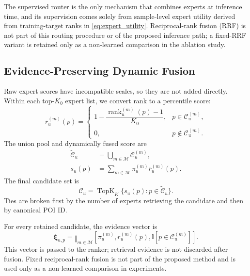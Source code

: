 \documentclass[journal]{IEEEtran}
\newcommand{\Experts}{\mathcal{M}}
\newcommand{\Ind}{\mathbb{I}}
\begin{document}
The supervised router is the only mechanism that combines experts at inference
time, and its supervision comes solely from sample-level expert utility derived
from training-target ranks in \eqref{eq:expert_utility}. Reciprocal-rank fusion
(RRF) is not part of this routing procedure or of the proposed inference path;
a fixed-RRF variant is retained only as a non-learned comparison in the
ablation study.

\subsection{Evidence-Preserving Dynamic Fusion}
\label{subsec:fusion}

Raw expert scores have incompatible scales, so they are not added directly.
Within each top-$K_0$ expert list, we convert rank to a percentile score:
\begin{equation}
\overline r_{u}^{(m)}(p)
=
\begin{cases}
1-\dfrac{\operatorname{rank}_{u}^{(m)}(p)-1}{K_0},
&
p\in\mathcal{C}_{u}^{(m)},\\[7pt]
0,
&
p\notin\mathcal{C}_{u}^{(m)}.
\end{cases}
\label{eq:rank_percentile}
\end{equation}
The union pool and dynamically fused score are
\begin{align}
\widetilde{\mathcal{C}}_u
&=
\bigcup_{m\in\Experts}\mathcal{C}_{u}^{(m)},
\label{eq:union_pool}\\
s_u(p)
&=
\sum_{m\in\Experts}
\pi_u^{(m)}\overline r_u^{(m)}(p).
\label{eq:dynamic_fusion}
\end{align}
The final candidate set is
\begin{equation}
\mathcal{C}_u
=
\operatorname{TopK}_{K}
\{s_u(p):p\in\widetilde{\mathcal{C}}_u\}.
\label{eq:final_candidate}
\end{equation}
Ties are broken first by the number of experts retrieving the candidate and
then by canonical POI ID.

For every retained candidate, the evidence vector is
\begin{equation}
\bm{\xi}_{u,p}
=
\mathop{\Vert}_{m\in\Experts}
[
\pi_u^{(m)},
\overline r_u^{(m)}(p),
\Ind[p\in\mathcal{C}_u^{(m)}]
].
\label{eq:evidence_vector}
\end{equation}
This vector is passed to the ranker; retrieval evidence is not discarded after
fusion.
Fixed reciprocal-rank fusion is not part of the proposed method and is used
only as a non-learned comparison in experiments.
\end{document}

